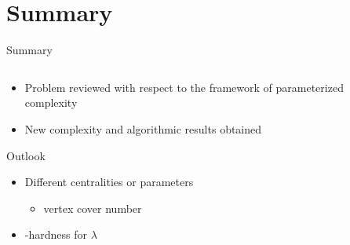 \section*{Summary}

\begin{frame}{Summary}
  \begin{columns}
    \begin{column}{0.54\textwidth}
      \begin{itemize}
        \item Problem reviewed with respect to the framework of parameterized complexity
        \item New complexity and algorithmic results obtained
      \end{itemize}

      \begin{center}
        Outlook
      \end{center}
      \begin{itemize}
        \item Different centralities or parameters
        \begin{itemize}
          \item vertex cover number
        \end{itemize}
        \item \Wone-hardness for $\lambda$ 
      \end{itemize}
    \end{column}

    \begin{column}{0.44\textwidth}
      
    \end{column}
  \end{columns}

\end{frame}
